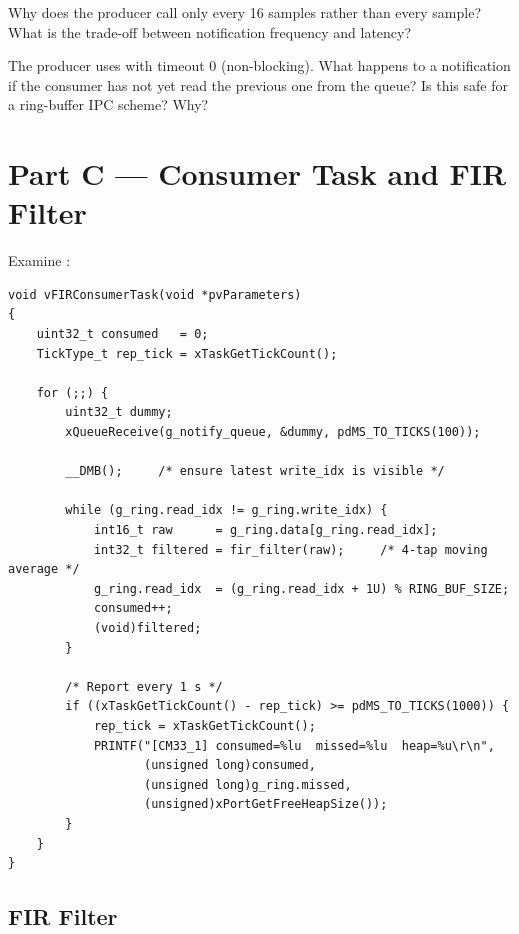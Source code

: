 \documentclass[11pt, a4paper]{article}
\begin{document}
\begin{questionbox}[~B1]
  Why does the producer call  only every 16 samples rather than
  every sample? What is the trade-off between notification frequency and latency?
\end{questionbox}

\begin{questionbox}[~B2]
  The producer uses  with timeout 0 (non-blocking). What happens
  to a notification if the consumer has not yet read the previous one from the
  queue? Is this safe for a ring-buffer IPC scheme? Why?
\end{questionbox}

\section{Part C --- Consumer Task and FIR Filter}

Examine :

\begin{lstlisting}[style=cstyle]
void vFIRConsumerTask(void *pvParameters)
{
    uint32_t consumed   = 0;
    TickType_t rep_tick = xTaskGetTickCount();

    for (;;) {
        uint32_t dummy;
        xQueueReceive(g_notify_queue, &dummy, pdMS_TO_TICKS(100));

        __DMB();     /* ensure latest write_idx is visible */

        while (g_ring.read_idx != g_ring.write_idx) {
            int16_t raw      = g_ring.data[g_ring.read_idx];
            int32_t filtered = fir_filter(raw);     /* 4-tap moving average */
            g_ring.read_idx  = (g_ring.read_idx + 1U) % RING_BUF_SIZE;
            consumed++;
            (void)filtered;
        }

        /* Report every 1 s */
        if ((xTaskGetTickCount() - rep_tick) >= pdMS_TO_TICKS(1000)) {
            rep_tick = xTaskGetTickCount();
            PRINTF("[CM33_1] consumed=%lu  missed=%lu  heap=%u\r\n",
                   (unsigned long)consumed,
                   (unsigned long)g_ring.missed,
                   (unsigned)xPortGetFreeHeapSize());
        }
    }
}
\end{lstlisting}

\subsection{FIR Filter}
\end{document}

